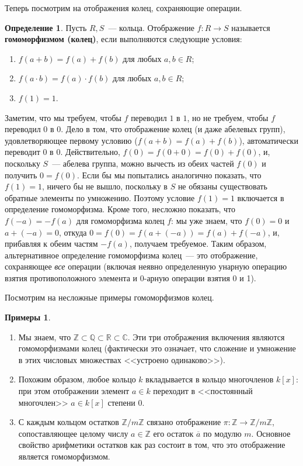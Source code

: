 \documentclass[a4paper,11pt]{scrartcl}
\theoremstyle{plain}
\theoremstyle{definition}
\newtheorem{definition}[theorem]{Определение}
\newtheorem{examples}[theorem]{Примеры}
\newcommand\dfn[1]{\textbf{#1}}
\newcommand\mb{\mathbb}
\begin{document}
Теперь посмотрим на отображения колец, сохраняющие операции.
\begin{definition}
Пусть $R, S$~--- кольца. Отображение $f\colon R\to S$ называется
\dfn{гомоморфизмом (колец)}, если выполняются следующие условия:
\begin{enumerate}
\item $f(a+b)=f(a)+f(b)$ для любых $a,b\in R$;
\item $f(a\cdot b)=f(a)\cdot f(b)$ для любых $a,b\in R$;
\item $f(1)=1$.
\end{enumerate}
\end{definition}
Заметим, что мы требуем, чтобы $f$ переводил $1$ в $1$, но не требуем,
чтобы $f$ переводил $0$ в $0$. Дело в том, что отображение колец (и
даже абелевых групп), удовлетворяющее первому условию
($f(a+b)=f(a)+f(b)$), автоматически переводит $0$ в
$0$. Действительно, $f(0)=f(0+0)=f(0)+f(0)$, и, поскольку $S$~---
абелева группа, можно вычесть из обеих частей $f(0)$ и получить
$0=f(0)$. Если бы мы попытались аналогично показать, что $f(1)=1$,
ничего бы не вышло, поскольку в $S$ не обязаны существовать обратные
элементы по умножению. Поэтому условие $f(1)=1$ включается в
определение гомоморфизма.
Кроме того, несложно показать, что $f(-a)=-f(a)$ для гомоморфизма
колец $f$: мы уже знаем, что
$f(0)=0$ и $a+(-a)=0$, откуда $0=f(0)=f(a+(-a))=f(a)+f(-a)$, и,
прибавляя к обеим частям $-f(a)$, получаем требуемое. Таким образом,
альтернативное определение гомоморфизма колец~--- это отображение,
сохраняющее \emph{все} операции (включая неявно определенную унарную
операцию взятия противоположного элемента и 0-арную операции взятия 0
и 1).

Посмотрим на несложные примеры гомоморфизмов колец.
\begin{examples}
\begin{enumerate}
\item Мы знаем, что $\mb Z\subset\mb Q\subset\mb R\subset\mb C$. Эти
  три отображения включения являются гомоморфизмами колец (фактически
  это означает, что сложение и умножение в этих числовых множествах
  <<устроено одинаково>>).
\item Похожим образом, любое кольцо $k$ вкладывается в кольцо
  многочленов $k[x]$: при этом отображении элемент $a\in k$ переходит
  в <<постоянный многочлен>> $a\in k[x]$ степени 0.
\item С каждым кольцом остатков $\mb Z/m\mb Z$ связано отображение
  $\pi\colon\mb Z\to \mb Z/m\mb Z$, сопоставляющее целому числу
  $a\in\mb Z$ его остаток $\overline{a}$ по модулю $m$. Основное
  свойство арифметики остатков как раз состоит в том, что это
  отображение является гомоморфизмом.
\end{enumerate}
\end{examples}
\end{document}
